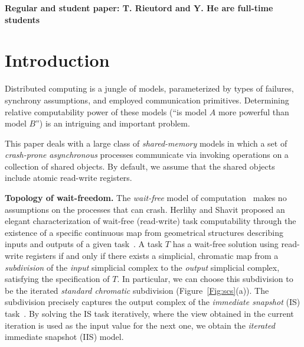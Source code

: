\documentclass[a4paper]{article}
\newcommand{\myparagraph}[1]{\vspace{6pt}\noindent \textbf{#1}}
\def\s {\mathbf{s}}
\begin{document}
\begin{center}
 {\bf Regular and student paper: T. Rieutord and Y. He are
   full-time students}
 \end{center}





\section{Introduction}

Distributed computing is a jungle of models, parameterized by 
types of failures, synchrony assumptions, and employed communication
primitives.
Determining relative computability power of these models (``is model
$A$ more powerful than model $B$'') is an intriguing and important
problem.

This paper deals with a large class of \emph{shared-memory} models in which a set of
\emph{crash-prone} \emph{asynchronous} processes communicate
via invoking operations on a
collection of shared objects. By default, we assume that the shared objects include 
atomic read-write registers.  


\myparagraph{Topology of wait-freedom.} The \emph{wait-free} model of computation~\cite{Her91} 
makes no assumptions on the processes that can crash. 
%
Herlihy and Shavit proposed an elegant 
characterization of wait-free (read-write) task computability through the
existence of a specific continuous map from geometrical
structures describing inputs and outputs of a given
task~\cite{HS99}.
%
A task $T$ has a wait-free solution using read-write registers  
if and only if there exists a simplicial, chromatic map from a
\emph{subdivision}  of the \emph{input} simplicial complex to the \emph{output} simplicial complex,
satisfying the specification of $T$.
%
In particular, we can choose this subdivision to be the iterated
\emph{standard chromatic} subdivision %
(Figure~\ref{Fig:scs}(a)).
The subdivision precisely captures the output complex of the
\emph{immediate snapshot} (IS) task~\cite{BG97}.
By solving the IS task iteratively, where the view obtained in the
current iteration is used as the input value for the next one, we obtain the
\emph{iterated} immediate snapshot (IIS) model.

\end{document}
